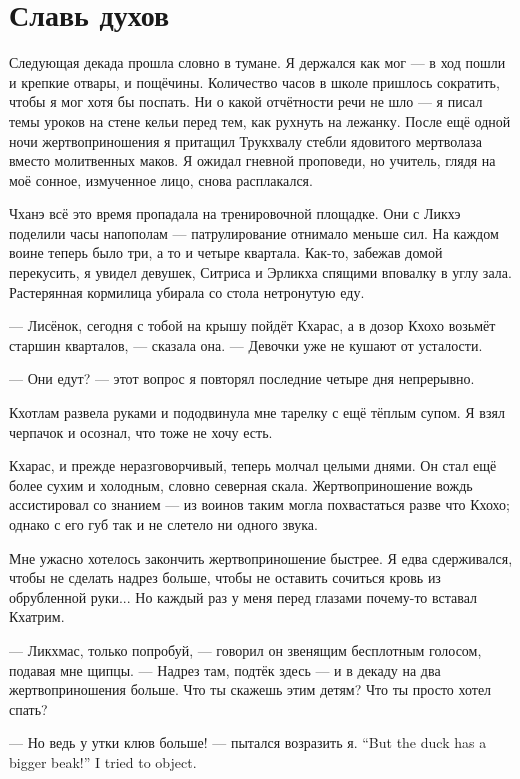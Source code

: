 \section{Славь духов}

Следующая декада прошла словно в тумане.
Я держался как мог --- в ход пошли и крепкие отвары, и пощёчины.
Количество часов в школе пришлось сократить, чтобы я мог хотя бы поспать.
Ни о какой отчётности речи не шло --- я писал темы уроков на стене кельи перед тем, как рухнуть на лежанку.
После ещё одной ночи жертвоприношения я притащил Трукхвалу стебли ядовитого мертволаза вместо молитвенных маков.
Я ожидал гневной проповеди, но учитель, глядя на моё сонное, измученное лицо, снова расплакался.

Чханэ всё это время пропадала на тренировочной площадке.
Они с Ликхэ поделили часы напополам --- патрулирование отнимало меньше сил.
На каждом воине теперь было три, а то и четыре квартала.
Как-то, забежав домой перекусить, я увидел девушек, Ситриса и Эрликха спящими вповалку в углу зала.
Растерянная кормилица убирала со стола нетронутую еду.

--- Лисёнок, сегодня с тобой на крышу пойдёт Кхарас, а в дозор Кхохо возьмёт старшин кварталов, --- сказала она.
--- Девочки уже не кушают от усталости.

--- Они едут? --- этот вопрос я повторял последние четыре дня непрерывно.

Кхотлам развела руками и пододвинула мне тарелку с ещё тёплым супом.
Я взял черпачок и осознал, что тоже не хочу есть.

Кхарас, и прежде неразговорчивый, теперь молчал целыми днями.
Он стал ещё более сухим и холодным, словно северная скала.
Жертвоприношение вождь ассистировал со знанием --- из воинов таким могла похвастаться разве что Кхохо;
однако с его губ так и не слетело ни одного звука.

Мне ужасно хотелось закончить жертвоприношение быстрее.
Я едва сдерживался, чтобы не сделать надрез больше, чтобы не оставить сочиться кровь из обрубленной руки...
Но каждый раз у меня перед глазами почему-то вставал Кхатрим.

--- Ликхмас, только попробуй, --- говорил он звенящим бесплотным голосом, подавая мне щипцы.
--- Надрез там, подтёк здесь --- и в декаду на два жертвоприношения больше.
Что ты скажешь этим детям?
Что ты просто хотел спать?

{--- Но ведь у утки клюв больше! --- пытался возразить я.}
{``But the duck has a bigger beak!'' I tried to object.}

